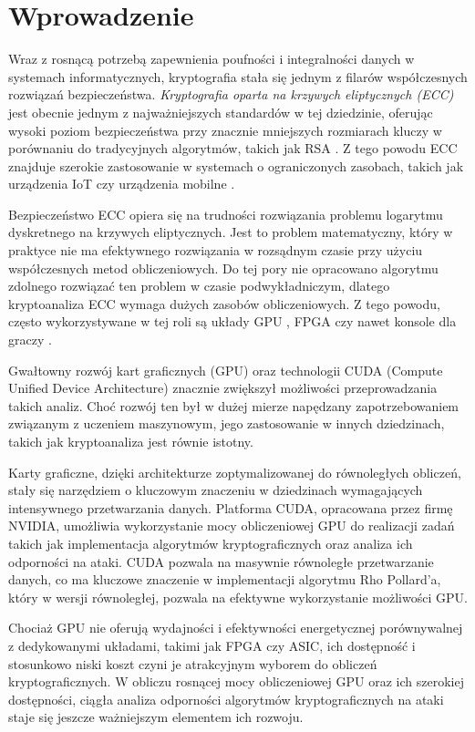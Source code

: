 \newpage
\section{Wprowadzenie}

Wraz z rosnącą potrzebą zapewnienia poufności i integralności danych w systemach
informatycznych, kryptografia stała się jednym z filarów współczesnych rozwiązań
bezpieczeństwa. \textit{Kryptografia oparta na krzywych eliptycznych (ECC)} jest
obecnie jednym z najważniejszych standardów w tej dziedzinie, oferując wysoki
poziom bezpieczeństwa przy znacznie mniejszych rozmiarach kluczy w porównaniu
do tradycyjnych algorytmów, takich jak RSA \cite[]{Ao2016,Barker2016}.
Z tego powodu ECC znajduje szerokie zastosowanie w systemach o ograniczonych zasobach, takich
jak urządzenia IoT czy urządzenia mobilne \cite[]{Thakur2022,Hammi2020}.

Bezpieczeństwo ECC opiera się na trudności rozwiązania problemu logarytmu
dyskretnego na krzywych eliptycznych. Jest to problem matematyczny, który w
praktyce nie ma efektywnego rozwiązania w rozsądnym czasie przy użyciu
współczesnych metod obliczeniowych. Do tej pory nie opracowano algorytmu
zdolnego rozwiązać ten problem w czasie podwykładniczym, dlatego
kryptoanaliza ECC wymaga dużych zasobów obliczeniowych.
Z tego powodu, często wykorzystywane w tej roli są układy GPU \cite[]{Boss2015,Panetta2017,Bernstein2012},
FPGA \cite[]{Wenger2014,Mane2011,FPGA2008,Majkowski2008}
czy nawet konsole dla graczy \cite{Bos2010}.

Gwałtowny rozwój kart graficznych (GPU) oraz technologii CUDA
(Compute Unified Device Architecture) znacznie zwiększył możliwości
przeprowadzania takich analiz. Choć rozwój ten był w dużej mierze napędzany
zapotrzebowaniem związanym z uczeniem maszynowym, jego zastosowanie w
innych dziedzinach, takich jak kryptoanaliza jest równie istotny.

Karty graficzne, dzięki architekturze zoptymalizowanej do równoległych obliczeń,
stały się narzędziem o kluczowym znaczeniu w dziedzinach wymagających intensywnego
przetwarzania danych. Platforma CUDA, opracowana przez firmę NVIDIA, umożliwia
wykorzystanie mocy obliczeniowej GPU do realizacji zadań takich jak
implementacja algorytmów kryptograficznych oraz analiza ich odporności na ataki.
CUDA pozwala na masywnie równoległe przetwarzanie danych, co ma kluczowe znaczenie
w implementacji algorytmu Rho Pollard'a, który w wersji równoległej, pozwala na efektywne
wykorzystanie możliwości GPU.

Chociaż GPU nie oferują wydajności i efektywności energetycznej 
porównywalnej z dedykowanymi układami, takimi jak FPGA czy ASIC, ich dostępność 
i stosunkowo niski koszt czyni je atrakcyjnym wyborem do obliczeń kryptograficznych. 
W obliczu rosnącej mocy obliczeniowej GPU oraz ich szerokiej dostępności, ciągła 
analiza odporności algorytmów kryptograficznych na ataki staje się jeszcze 
ważniejszym elementem ich rozwoju.

